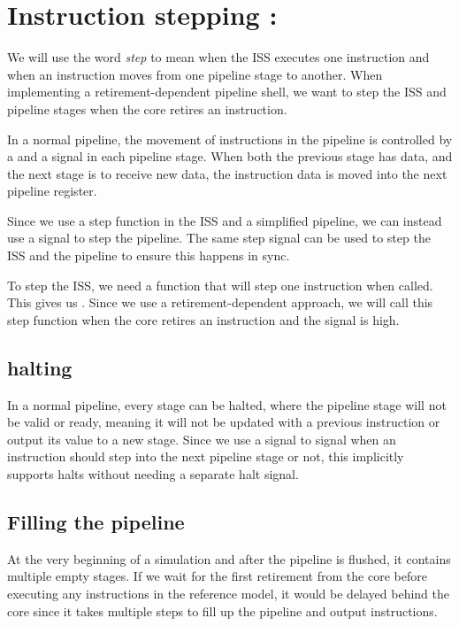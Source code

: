 \section{Instruction stepping : }

We will use the word \textit{\gls{step}} to mean when the ISS executes one instruction and when an instruction moves from one pipeline stage to another. When implementing a retirement-dependent pipeline shell, we want to step the ISS and pipeline stages when the core retires an instruction.

In a normal pipeline, the movement of instructions in the pipeline is controlled by a  and a  signal in each pipeline stage. When both the previous stage has  data, and the next stage is  to receive new data, the instruction data is moved into the next pipeline register.

Since we use a step function in the ISS and a simplified pipeline, we can instead use a  signal to step the pipeline. The same step signal can be used to step the ISS and the pipeline to ensure this happens in sync.

To step the ISS, we need a function that will step one instruction when called. This gives us \textbf{}. Since we use a retirement-dependent approach, we will call this step function when the core retires an instruction and the  signal is high. 

\subsection{halting}

In a normal pipeline, every stage can be halted, where the pipeline stage will not be valid or ready, meaning it will not be updated with a previous instruction or output its value to a new stage. Since we use a  signal to signal when an instruction should step into the next pipeline stage or not, this implicitly supports halts without needing a separate halt signal. 

\subsection{Filling the pipeline}

At the very beginning of a simulation and after the pipeline is flushed, it contains multiple empty stages. If we wait for the first retirement from the core before executing any instructions in the reference model, it would be delayed behind the core since it takes multiple steps to fill up the pipeline and output instructions. 

